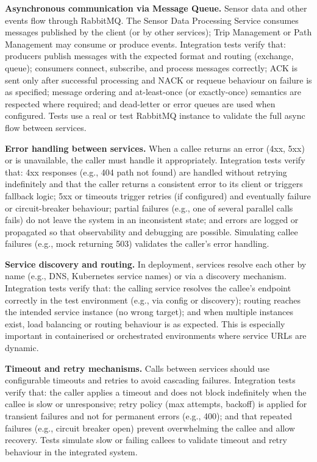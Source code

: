 \textbf{Asynchronous communication via Message Queue.}
Sensor data and other events flow through RabbitMQ. The Sensor Data Processing Service consumes messages published by the client (or by other services); Trip Management or Path Management may consume or produce events. Integration tests verify that: producers publish messages with the expected format and routing (exchange, queue); consumers connect, subscribe, and process messages correctly; ACK is sent only after successful processing and NACK or requeue behaviour on failure is as specified; message ordering and at-least-once (or exactly-once) semantics are respected where required; and dead-letter or error queues are used when configured. Tests use a real or test RabbitMQ instance to validate the full async flow between services.

\textbf{Error handling between services.}
When a callee returns an error (4xx, 5xx) or is unavailable, the caller must handle it appropriately. Integration tests verify that: 4xx responses (e.g., 404 path not found) are handled without retrying indefinitely and that the caller returns a consistent error to its client or triggers fallback logic; 5xx or timeouts trigger retries (if configured) and eventually failure or circuit-breaker behaviour; partial failures (e.g., one of several parallel calls fails) do not leave the system in an inconsistent state; and errors are logged or propagated so that observability and debugging are possible. Simulating callee failures (e.g., mock returning 503) validates the caller's error handling.

\textbf{Service discovery and routing.}
In deployment, services resolve each other by name (e.g., DNS, Kubernetes service names) or via a discovery mechanism. Integration tests verify that: the calling service resolves the callee's endpoint correctly in the test environment (e.g., via config or discovery); routing reaches the intended service instance (no wrong target); and when multiple instances exist, load balancing or routing behaviour is as expected. This is especially important in containerised or orchestrated environments where service URLs are dynamic.

\textbf{Timeout and retry mechanisms.}
Calls between services should use configurable timeouts and retries to avoid cascading failures. Integration tests verify that: the caller applies a timeout and does not block indefinitely when the callee is slow or unresponsive; retry policy (max attempts, backoff) is applied for transient failures and not for permanent errors (e.g., 400); and that repeated failures (e.g., circuit breaker open) prevent overwhelming the callee and allow recovery. Tests simulate slow or failing callees to validate timeout and retry behaviour in the integrated system.
